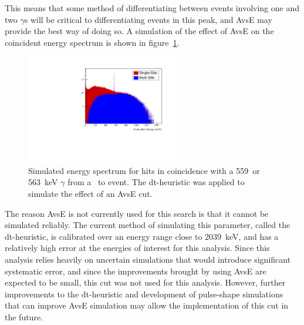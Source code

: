 \documentclass[/main.tex]{subfiles}
\begin{document}
This means that some method of differentiating between events involving one and two $\gamma$s will be critical to differentiating events in this peak, and AvsE may provide the best way of doing so.
A simulation of the effect of AvsE on the coincident energy spectrum is shown in figure~\ref{fig:coincavse}.
\begin{figure}[tb]
  \centering
  \includegraphics[width=0.6\textwidth]{coincidentcutwithavse}
  \caption[Coincident energy spectrum with multi-site event cut]{\label{fig:coincavse}
    Simulated energy spectrum for hits in coincidence with a 559~or 563~keV $\gamma$ from a \tnbb\ to  event. The dt-heuristic was applied to simulate the effect of an AvsE cut.
  }
\end{figure}
The reason AvsE is not currently used for this search is that it cannot be simulated reliably.
The current method of simulating this parameter, called the dt-heuristic, is calibrated over an energy range close to 2039~keV, and has a relatively high error at the energies of interest for this analysis.
Since this analysis relies heavily on uncertain simulations that would introduce significant systematic error, and since the improvements brought by using AvsE are expected to be small, this cut was not used for this analysis.
However, further improvements to the dt-heuristic and development of pulse-shape simulations that can improve AvsE simulation may allow the implementation of this cut in the future.
\\
\end{document}

